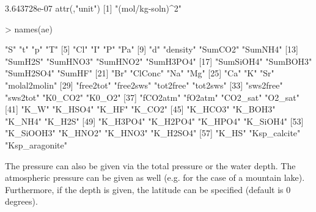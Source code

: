 \documentclass[article,nojss]{jss}
\begin{document}
\begin{Schunk}
\begin{Soutput}
[1] 3.643728e-07
attr(,"unit")
[1] "(mol/kg-soln)^2"
\end{Soutput}
\begin{Sinput}
> names(ae)
\end{Sinput}
\begin{Soutput}
 [1] "S"             "t"             "p"             "T"            
 [5] "Cl"            "I"             "P"             "Pa"           
 [9] "d"             "density"       "SumCO2"        "SumNH4"       
[13] "SumH2S"        "SumHNO3"       "SumHNO2"       "SumH3PO4"     
[17] "SumSiOH4"      "SumBOH3"       "SumH2SO4"      "SumHF"        
[21] "Br"            "ClConc"        "Na"            "Mg"           
[25] "Ca"            "K"             "Sr"            "molal2molin"  
[29] "free2tot"      "free2sws"      "tot2free"      "tot2sws"      
[33] "sws2free"      "sws2tot"       "K0_CO2"        "K0_O2"        
[37] "fCO2atm"       "fO2atm"        "CO2_sat"       "O2_sat"       
[41] "K_W"           "K_HSO4"        "K_HF"          "K_CO2"        
[45] "K_HCO3"        "K_BOH3"        "K_NH4"         "K_H2S"        
[49] "K_H3PO4"       "K_H2PO4"       "K_HPO4"        "K_SiOH4"      
[53] "K_SiOOH3"      "K_HNO2"        "K_HNO3"        "K_H2SO4"      
[57] "K_HS"          "Ksp_calcite"   "Ksp_aragonite"
\end{Soutput}
\end{Schunk}

The pressure can also be given via the total pressure or the water depth. The atmospheric pressure can be given as well (e.g. for the case of a mountain lake). 
Furthermore, if the depth is given, the latitude can be specified (default is 0 degrees).
\end{document}
